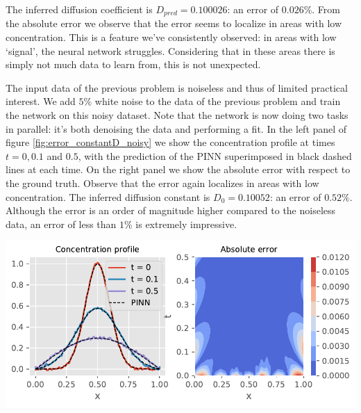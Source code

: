 \documentclass{Dissertate}
\let\origfigure\figure
\let\endorigfigure\endfigure
\renewenvironment{figure}[1][2] {
    \expandafter\origfigure\expandafter[H]
} {
    \endorigfigure
}
\begin{document}
The inferred diffusion coefficient is \(D_{pred} = 0.100026\): an error
of \(0.026\%\). From the absolute error we observe that the error seems
to localize in areas with low concentration. This is a feature we've
consistently observed: in areas with low `signal', the neural network
struggles. Considering that in these areas there is simply not much data
to learn from, this is not unexpected.

The input data of the previous problem is noiseless and thus of limited
practical interest. We add \(5\%\) white noise to the data of the
previous problem and train the network on this noisy dataset. Note that
the network is now doing two tasks in parallel: it's both denoising the
data and performing a fit. In the left panel of figure
\ref{fig:error_constantD_noisy} we show the concentration profile
at times \(t = 0, 0.1\) and \(0.5\), with the prediction of the PINN
superimposed in black dashed lines at each time. On the right panel we
show the absolute error with respect to the ground truth. Observe that
the error again localizes in areas with low concentration. The inferred
diffusion constant is \(D_0 = 0.10052\): an error of \(0.52\%\).
Although the error is an order of magnitude higher compared to the
noiseless data, an error of less than \(1\%\) is extremely impressive.

\begin{figure}
\hypertarget{fig:error_constantD_noisy}{%
\centering
\includegraphics{source/figures/pdf/error_constantD_noisy.pdf}
\caption{\textbf{Left panel}: The original noisy concentration profile
at several times with the neural network inferred denoised version
superimposed. \textbf{Right panel}: The absolute error of neural network
with respect to the ground truth. Note that most of the error is located
at areas with low concentration.}\label{fig:error_constantD_noisy}
}
\end{figure}
\end{document}
